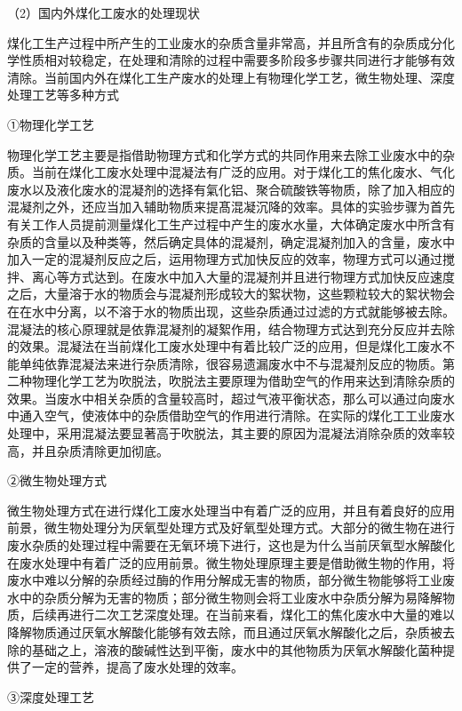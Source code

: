（2）国内外煤化工废水的处理现状\par
煤化工生产过程中所产生的工业废水的杂质含量非常高，并且所含有的杂质成分化学性质相对较稳定，在处理和清除的过程中需要多阶段多步骤共同进行才能够有效清除。当前国内外在煤化工生产废水的处理上有物理化学工艺，微生物处理、深度处理工艺等多种方式\par
①物理化学工艺\par
物理化学工艺主要是指借助物理方式和化学方式的共同作用来去除工业废水中的杂质。当前在煤化工废水处理中混凝法有广泛的应用。对于煤化工的焦化废水、气化废水以及液化废水的混凝剂的选择有氣化铝、聚合硫酸铁等物质，除了加入相应的混凝剂之外，还应当加入辅助物质来提髙混凝沉降的效率。具体的实验步骤为首先有关工作人员提前测量煤化工生产过程中产生的废水水量，大体确定废水中所含有杂质的含量以及种类等，然后确定具体的混凝剂，确定混凝剂加入的含量，废水中加入一定的混凝剂反应之后，运用物理方式加快反应的效率，物理方式可以通过搅拌、离心等方式达到。在废水中加入大量的混凝剂并且进行物理方式加快反应速度之后，大量溶于水的物质会与混凝剂形成较大的絮状物，这些颗粒较大的絮状物会在在水中分离，以不溶于水的物质出现，这些杂质通过过滤的方式就能够被去除。\cite{wangchunxu_2016}混凝法的核心原理就是依靠混凝剂的凝絮作用，结合物理方式达到充分反应并去除的效果。混凝法在当前煤化工废水处理中有着比较广泛的应用，但是煤化工废水不能单纯依靠混凝法来进行杂质清除，很容易遗漏废水中不与混凝剂反应的物质。第二种物理化学工艺为吹脱法，吹脱法主要原理为借助空气的作用来达到清除杂质的效果。当废水中相关杂质的含量较高时，超过气液平衡状态，那么可以通过向废水中通入空气，使液体中的杂质借助空气的作用进行清除。在实际的煤化工工业废水处理中，采用混凝法要显著高于吹脱法，其主要的原因为混凝法消除杂质的效率较高，并且杂质清除更加彻底。\par
②微生物处理方式\par
微生物处理方式在进行煤化工废水处理当中有着广泛的应用，并且有着良好的应用前景，微生物处理分为厌氧型处理方式及好氧型处理方式。大部分的微生物在进行废水杂质的处理过程中需要在无氧环境下进行，这也是为什么当前厌氧型水解酸化在废水处理中有着广泛的应用前景。微生物处理原理主要是借助微生物的作用，将废水中难以分解的杂质经过酶的作用分解成无害的物质，部分微生物能够将工业废水中的杂质分解为无害的物质；部分微生物则会将工业废水中杂质分解为易降解物质，后续再进行二次工艺深度处理。\cite{yaoshuo_2016}在当前来看，煤化工的焦化废水中大量的难以降解物质通过厌氧水解酸化能够有效去除，而且通过厌氧水解酸化之后，杂质被去除的基础之上，溶液的酸碱性达到平衡，废水中的其他物质为厌氧水解酸化菌种提供了一定的营养，提高了废水处理的效率。\cite{yuhai_2014}\par
③深度处理工艺\par
